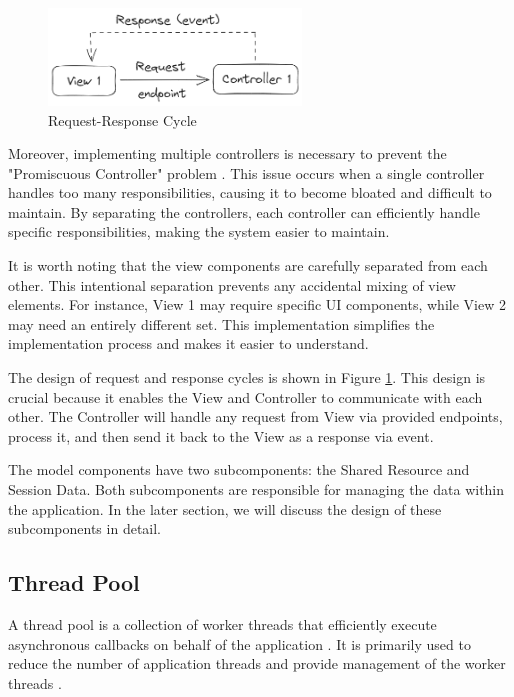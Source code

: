 \begin{figure}[!ht]
    \centering
    \includegraphics[width=0.6\textwidth]{texs/Part2/chapter3/image/reqres.png}
    \caption{Request-Response Cycle}
    \label{fig:reqres}
\end{figure}

Moreover, implementing multiple controllers is necessary to prevent the "Promiscuous Controller" problem \cite[2127]{Aniche2017}. This issue occurs when a single controller handles too many responsibilities, causing it to become bloated and difficult to maintain. By separating the controllers, each controller can efficiently handle specific responsibilities, making the system easier to maintain.

It is worth noting that the view components are carefully separated from each other. This intentional separation prevents any accidental mixing of view elements. For instance, View 1 may require specific UI components, while View 2 may need an entirely different set. This implementation simplifies the implementation process and makes it easier to understand.

The design of request and response cycles is shown in Figure \ref{fig:reqres}. This design is crucial because it enables the View and Controller to communicate with each other. The Controller will handle any request from View via provided endpoints, process it, and then send it back to the View as a response via event.

The model components have two subcomponents: the Shared Resource and Session Data. Both subcomponents are responsible for managing the data within the application. In the later section, we will discuss the design of these subcomponents in detail.

\subsection{Thread Pool}
\label{subsec:thread-pool}

A thread pool is a collection of worker threads that efficiently execute asynchronous callbacks on behalf of the application \cite{Karl-Bridge-Microsoft}. It is primarily used to reduce the number of application threads and provide management of the worker threads \cite{Karl-Bridge-Microsoft}.

